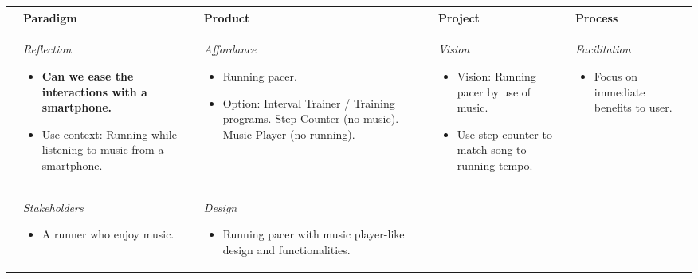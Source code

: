 \begin{table}
\footnotesize
\begin{tabular}{|l|l|l|l|l|} \hline
         & \textbf{Paradigm} & \textbf{Product} & \textbf{Project} & \textbf{Process} \\ \hline
\parbox[t][4cm][c]{0.02\textwidth}{} %
	& \parbox[t][][c]{0.20\textwidth}{ 
		\textit{Reflection}
		\begin{itemize}[leftmargin=*]
		\item \textbf{\color{darkGreen}Can we ease the interactions with a smartphone.}
		\item Use context: Running while listening to music from a smartphone.
		\end{itemize}
	}
	& \parbox[t][][c]{0.20\textwidth}{ 
		\textit{Affordance} 
		\begin{itemize}[leftmargin=*]
		\item Running pacer. 
		\item Option: 
			Interval Trainer / Training programs. \newline
			Step Counter (no music). \newline
			Music Player (no running). 
		\end{itemize}	 
	}
	& \parbox[t][][c]{0.20\textwidth}{  
		\textit{Vision} 
		\begin{itemize}[leftmargin=*]
		\item Vision: Running pacer by use of music. 
		\item Use step counter to match song to running tempo.
		\end{itemize}
	}
    & \parbox[t][][c]{0.20\textwidth}{ 
	    \textit{Facilitation}
   		\begin{itemize}[leftmargin=*]
		\item Focus on immediate benefits to user.
		\end{itemize}
   } \\ \hline
\parbox[t][5cm][c]{0.02\textwidth}{}
	& \parbox[t][][c]{0.20\textwidth}{ 
	    \textit{Stakeholders} 
		\begin{itemize}[leftmargin=*]
		\item A runner who enjoy music.
		\end{itemize}
	}
	& \parbox[t][][c]{0.20\textwidth}{ 
		\textit{Design} 
		\begin{itemize}[leftmargin=*]
		\item Running pacer with music player-like design and functionalities.  

\end{itemize}}
\end{tabular}
\end{table}

